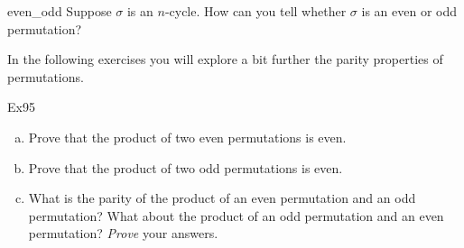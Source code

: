 \begin{exercise}{even_odd}
Suppose $\sigma$ is an $n$-cycle.  How can you tell  whether $\sigma$ is an even or odd permutation?
\end{exercise}


In the following exercises you will explore a bit further the parity properties of permutations. 

\begin{exercise}{Ex95} %
\begin{enumerate}[(a)]
\item
Prove that the product of two even permutations is even.
\item
Prove that the product of two odd permutations is even.
\item
What is the parity of  the product of an even permutation and an odd permutation?  What about the product of an odd permutation and an even permutation? \emph{Prove} your answers.
\end{enumerate}
\end{exercise}
%
%
%
%
%

